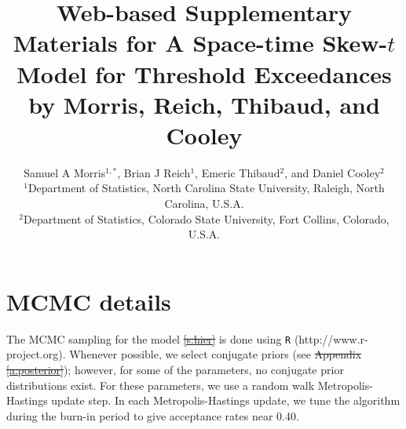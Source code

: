 \documentclass[useAMS,usenatbib,referee]{biomweb}
\title[Web-based Supplementary Materials for A Space-time Skew-$t$ Model for Threshold Exceedances]{Web-based Supplementary Materials for A Space-time Skew-$t$ Model for Threshold Exceedances by Morris, Reich, Thibaud, and Cooley}
\author
{Samuel A Morris$^{1,*}$\email{samorris@ncsu.edu},
Brian J Reich$^{1}$,
Emeric Thibaud$^{2}$, and
Daniel Cooley$^{2}$\\
$^{1}$Department of Statistics, North Carolina State University, Raleigh, North Carolina, U.S.A. \\
$^{2}$Department of Statistics, Colorado State University, Fort Collins, Colorado, U.S.A.}
\providecommand{\DIFadd}[1]{{\protect\color{blue}\uwave{#1}}} %
\providecommand{\DIFdel}[1]{{\protect\color{red}\sout{#1}}}                      %
\providecommand{\DIFaddbegin}{} %
\providecommand{\DIFaddend}{} %
\providecommand{\DIFdelbegin}{} %
\providecommand{\DIFdelend}{} %
\begin{document}
\maketitle



\DIFdelbegin %
\DIFdelend \DIFaddbegin \renewcommand{\thesection}{Web Appendix~\Alph{section}}
\DIFaddend %

\section{MCMC details} \DIFdelbegin %
\DIFdelend \DIFaddbegin \label{sta:mcmc}
\DIFaddend The MCMC sampling for the model \DIFdelbegin \DIFdel{\ref{s:hier} }\DIFdelend \DIFaddbegin \DIFadd{in } \DIFaddend is done using {\tt R} (http://www.r-project.org). Whenever possible, we select conjugate priors (see \DIFdelbegin \DIFdel{Appendix \ref{a:posterior}}\DIFdelend \DIFaddbegin {}\DIFaddend ); however, for some of the parameters, no conjugate prior distributions exist.
For these parameters, we use a random walk Metropolis-Hastings update step.
In each Metropolis-Hastings update, we tune the algorithm during the burn-in period to give acceptance rates near 0.40.
\end{document}
